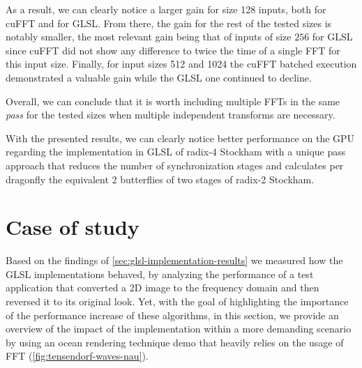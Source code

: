 \documentclass[
  oneside,
  11pt, a4paper,
  footinclude=true,
  headinclude=true,
  cleardoublepage=empty
]{scrbook}
\begin{document}
As a result, we can clearly notice a larger gain for size 128 inputs, both for cuFFT and for GLSL. From there, the gain for the rest of the tested sizes is notably smaller, the most relevant gain being that of inputs of size $256$ for GLSL since cuFFT did not show any difference to twice the time of a single FFT for this input size. Finally, for input sizes 512 and 1024 the cuFFT batched execution demonstrated a valuable gain while the GLSL one continued to decline.

Overall, we can conclude that it is worth including multiple FFTs in the same \textit{pass} for the tested sizes when multiple independent transforms are necessary. \newline




With the presented results, we can clearly notice better performance on the GPU regarding the implementation in GLSL of radix-4 Stockham with a unique pass approach that reduces the number of synchronization stages and calculates per dragonfly the equivalent $2$ butterflies of two stages of radix-2 Stockham.

\section{Case of study} \label{sec:case-of-study}

Based on the findings of \autoref{sec:glsl-implementation-results} we measured how the GLSL implementations behaved, by analyzing the performance of a test application that converted a 2D image to the frequency domain and then reversed it to its original look. Yet, with the goal of highlighting the importance of the performance increase of these algorithms, in this section, we provide an overview of the impact of the implementation within a more demanding scenario by using an ocean rendering technique demo that heavily relies on the usage of FFT (\autoref{fig:tensendorf-waves-nau}).
\newline
\end{document}
